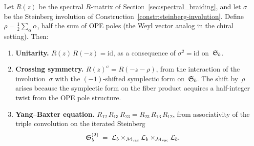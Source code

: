 \begin{conjecture}
\label{conj:R-matrix-steinberg}
Let $R(z)$ be the spectral $R$-matrix of
Section~\ref{sec:spectral_braiding}, and let $\sigma$ be the
Steinberg involution of
Construction~\ref{constr:steinberg-involution}. Define
$\rho = \tfrac{1}{2}\sum_{\alpha} \alpha$, half the sum of OPE
poles (the Weyl vector analog in the chiral setting). Then:
\begin{enumerate}
\item \textbf{Unitarity.}
$R(z)\,R(-z) = \mathrm{id}$, as a consequence of
$\sigma^2 = \mathrm{id}$ on~$\mathfrak{S}_b$.

\item \textbf{Crossing symmetry.}
$R(z)^{\sigma} = R(-z - \rho)$, from the interaction of the
involution~$\sigma$ with the $(-1)$-shifted symplectic form
on~$\mathfrak{S}_b$. The shift by~$\rho$ arises because the
symplectic form on the fiber product acquires a half-integer
twist from the OPE pole structure.

\item \textbf{Yang--Baxter equation.}
$R_{12}\,R_{13}\,R_{23} = R_{23}\,R_{13}\,R_{12}$, from
associativity of the triple convolution on the iterated
Steinberg
\[
\mathfrak{S}_b^{(2)} \;=\;
\mathcal{L}_b \times_{{\mathcal{M}_{\mathrm{vac}}}} \mathcal{L}_b
\times_{{\mathcal{M}_{\mathrm{vac}}}} \mathcal{L}_b.
\]
\end{enumerate}
\end{conjecture}

